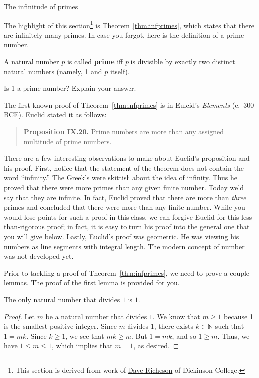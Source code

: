 \begin{section}{The infinitude of primes}

The highlight of this section\footnote{This section is derived from work of \href{http://users.dickinson.edu/~richesod/}{Dave Richeson} of Dickinson College.} is Theorem~\ref{thm:infprimes}, which states that there are infinitely many primes. In case you forgot, here is the definition of a prime number.

\begin{definition}
A natural number $p$ is called \textbf{prime} iff $p$ is divisible by exactly two distinct natural numbers (namely, 1 and $p$ itself).
\end{definition}

\begin{exercise}
Is 1 a prime number?  Explain your answer.
\end{exercise}

The first known proof of Theorem~\ref{thm:infprimes} is in Eulcid's \emph{Elements} (c.\ 300 BCE). Euclid stated it as follows: 
\begin{quote}
\textbf{Proposition IX.20.} Prime numbers are more than any assigned multitude of prime numbers.
\end{quote}
There are a few interesting observations to make about Euclid's proposition and his proof. First, notice that the statement of the theorem does not contain the word ``infinity.'' The Greek's were skittish about the idea of infinity. Thus he proved that there were more primes than any given finite number. Today we'd say that they are infinite. In fact, Euclid proved that there are more than \emph{three} primes and concluded that there were more than any finite number. While you would lose points for such a proof in this class, we can forgive Euclid for this less-than-rigorous proof;  in fact, it is easy to turn his proof into the general one that you will give below. Lastly, Euclid's proof was geometric. He was viewing his numbers as line segments with integral length. The modern concept of number was not developed yet.

Prior to tackling a proof of Theorem~\ref{thm:infprimes}, we need to prove a couple lemmas.  The proof of the first lemma is provided for you. 

\begin{lemma-given}\label{lem:divisorsof1}
The only natural number that divides $1$ is $1$.  
\end{lemma-given}

\begin{proof}
Let $m$ be a natural number that divides $1$. We know that $m\geq 1$ because 1 is the smallest positive integer. Since $m$ divides $1$, there exists $k\in \mathbb{N}$ such that $1=mk$. Since $k\geq 1$, we see that $mk\geq m$.  But $1=mk$, and so $1\geq m$.  Thus, we have $1\leq m \leq 1$, which implies that $m=1$, as desired.
\end{proof}


\end{section}
